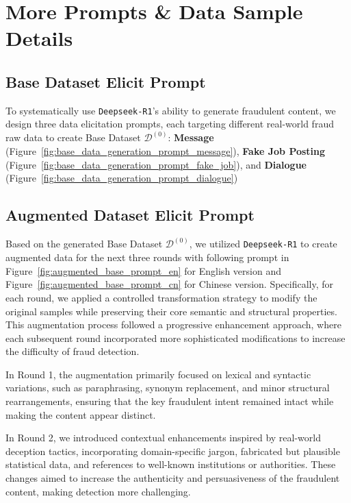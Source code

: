 \section{More Prompts \& \ourbench Data Sample Details}

\subsection{Base Dataset Elicit Prompt}
To systematically use \texttt{Deepseek-R1}'s ability to generate fraudulent content, we design three data elicitation prompts, each targeting different real-world fraud raw data to create Base Dataset \(\mathcal{D}^{(0)}\):  \textbf{Message} (Figure~\ref{fig:base_data_generation_prompt_message}), \textbf{Fake Job Posting} (Figure~\ref{fig:base_data_generation_prompt_fake_job}), and \textbf{Dialogue} (Figure~\ref{fig:base_data_generation_prompt_dialogue})



\label{app:prompt_basedata_elicit}

\subsection{Augmented Dataset Elicit Prompt}
\label{app:prompt_augmenteddata_elicit}
Based on the generated Base Dataset \(\mathcal{D}^{(0)}\), we utilized \texttt{Deepseek-R1} to create augmented data for the next three rounds with following prompt in Figure~\ref{fig:augmented_base_prompt_en} for English version and Figure~\ref{fig:augmented_base_prompt_cn} for Chinese version. Specifically, for each round, we applied a controlled transformation strategy to modify the original samples while preserving their core semantic and structural properties. This augmentation process followed a progressive enhancement approach, where each subsequent round incorporated more sophisticated modifications to increase the difficulty of fraud detection. 

In Round 1, the augmentation primarily focused on lexical and syntactic variations, such as paraphrasing, synonym replacement, and minor structural rearrangements, ensuring that the key fraudulent intent remained intact while making the content appear distinct. 

In Round 2, we introduced contextual enhancements inspired by real-world deception tactics, incorporating domain-specific jargon, fabricated but plausible statistical data, and references to well-known institutions or authorities. These changes aimed to increase the authenticity and persuasiveness of the fraudulent content, making detection more challenging.

